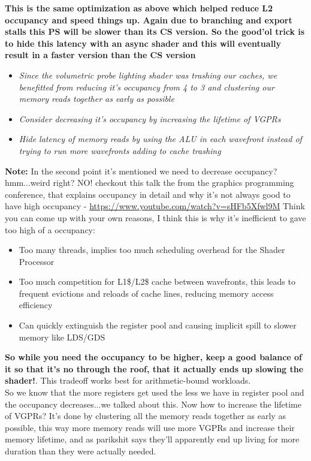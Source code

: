 \documentclass[14pt]{article}
\begin{document}
	\textbf{This is the same optimization as above which helped reduce L2 occupancy and speed things up. Again due to branching and export stalls this PS will be slower than its CS version. So the good'ol trick is to hide this latency with an async shader and this will eventually result in a faster version than the CS version}


\begin{itemize}
	\item \textit{Since the volumetric probe lighting shader was trashing our caches, we benefitted from reducing it's occupancy from 4 to 3 and clustering our memory reads together as early as possible}
	
	\item \textit{Consider decreasing it's occupancy by increasing the lifetime of VGPRs}
	
	\item \textit{Hide latency of memory reads by using the ALU in each wavefront instead of trying to run more wavefronts adding to cache trashing}
\end{itemize}

	\textbf{Note:} In the second point it's mentioned we need to decrease occupancy? hmm...weird right? NO! checkout this talk the from the graphics programming conference, that explains occupancy in detail and why it's not always good to have high occupancy\cite{occu} - \url{https://www.youtube.com/watch?v=sHFb5Xfwl9M}
	Think you can come up with your own reasons, I think this is why it's inefficient to gave too high of a occupancy:
	\begin{itemize}
		\item Too many threads, implies too much scheduling overhead for the Shader Processor
		\item Too much competition for L1\$/L2\$ cache between wavefronts, this leads to frequent evictions and reloads of cache lines, reducing memory access efficiency
		\item Can quickly extinguish the register pool and causing implicit spill to slower memory like LDS/GDS
	\end{itemize}
		
	\textbf{So while you need the occupancy to be higher, keep a good balance of it so that it's no through the roof, that it actually ends up slowing the shader!}. This tradeoff works best for arithmetic-bound workloads. \\
	
		So we know that the more registers get used the less we have in register pool and the occupancy decreases...we talked about this. Now how to increase the lifetime of VGPRs?
		It's done by clustering all the memory reads together as early as possible, this way more memory reads will use more VGPRs and increase their memory lifetime, and as parikshit says they'll apparently end up living for more duration than they were actually needed. \\
		
\end{document}

